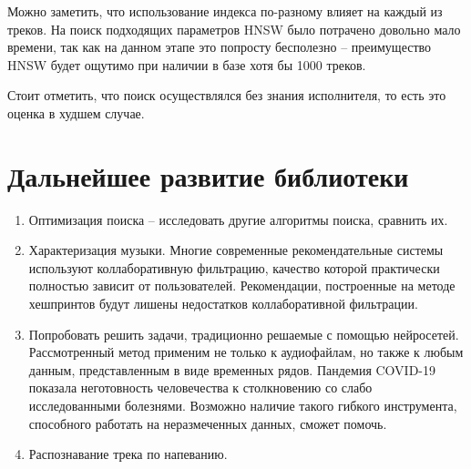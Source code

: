 Можно заметить, что использование индекса по-разному влияет на каждый из треков.
На поиск подходящих параметров HNSW было потрачено довольно мало времени, так как
на данном этапе это попросту бесполезно -- преимущество HNSW будет ощутимо при наличии в базе
хотя бы 1000 треков.

Стоит отметить, что поиск осуществлялся без знания исполнителя, то есть это оценка в худшем случае.

\section{Дальнейшее развитие библиотеки}
\begin{enumerate}[label=\arabic*.]
    \item Оптимизация поиска -- исследовать другие алгоритмы поиска, сравнить их.
    \item Характеризация музыки. Многие современные рекомендательные системы используют
    коллаборативную фильтрацию, качество которой практически полностью зависит от пользователей.
    Рекомендации, построенные на методе хешпринтов будут лишены недостатков
    коллаборативной фильтрации.
    \item Попробовать решить задачи, традиционно решаемые с помощью нейросетей.
    Рассмотренный метод применим не только к аудиофайлам, но также к любым данным, представленным
    в виде временных рядов.
    Пандемия COVID-19 показала неготовность человечества к столкновению со слабо исследованными
    болезнями. Возможно наличие такого гибкого инструмента, способного работать на неразмеченных данных,
    сможет помочь.
    \item Распознавание трека по напеванию.
\end{enumerate}